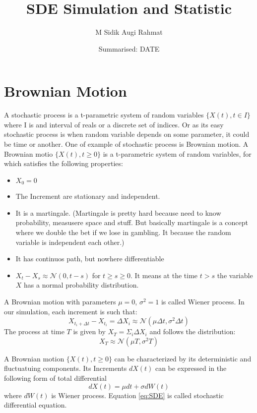 \documentclass[a4paper]{article}
\title{SDE Simulation and Statistic}
\date{Summarised: DATE}
\author{M Sidik Augi Rahmat}
\begin{document}
\maketitle


\section{Brownian Motion}
A stochastic process is a t-parametric system of random variables $\{ X(t), t \in I\}$ where I is and interval of reals or a discrete set of indices. Or as its easy
stochastic process is when random variable depends on some parameter, it could be time or another. One of example of stochastic process is Brownian motion. A Brownian
motio $\{ X(t), t\geq 0 \}$ is a t-parametric system of random variables, for which satisfies the following properties:
\begin{itemize}
    \item $X_0 = 0$
    \item The Increment are stationary and independent.
    \item It is a martingale. (Martingale is pretty hard because need to know probability, measusere space and stuff. But basically martingale is a concept where
    we double the bet if we lose in gambling. It because the random variable is independent each other.)
    \item It has continuos path, but nowhere differentiable
    \item $X_t - X_s \approx \mathcal{N}(0, t - s)$ for $t \geq s \geq 0$. It means  at the time $t>s$ the variable $X$ has a normal probability distribution.
\end{itemize}
A Brownian motion with parameters $\mu = 0$, $\sigma^2 = 1$ is called Wiener process.
In our simulation, each increment is such that:
\begin{equation}
    X_{t_{i} + \Delta t} - X_{t_{i}} = \Delta X_i \approx \mathcal{N}(\mu \Delta t, \sigma^2 \Delta t)
\end{equation}
The process at time $T$ is given by $X_T = \Sigma_i \Delta X_i$ and follows the distribution:
\begin{equation}
    X_T \approx \mathcal{N}(\mu T, \sigma^2 T)
\end{equation}

A Brownian motion $\{ X(t), t\geq 0\}$ can be characterized by its deterministic and fluctuatuing components. Its Increments $dX(t)$ can be expressed in the following form 
of total differential 
\begin{equation}
    dX(t) =\mu dt + \sigma dW(t)
    \label{eq:SDE}
\end{equation}
where $dW(t)$ is Wiener process. Equation \ref{eq:SDE} is called stochastic differential equation.
\end{document}
